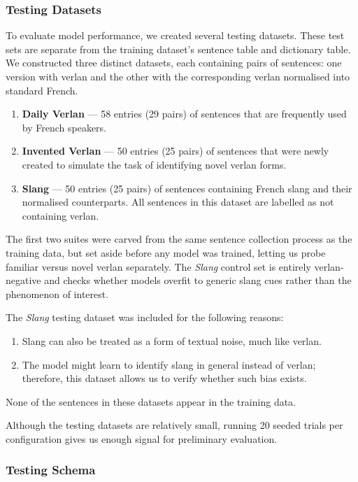 \documentclass[12pt]{article}
\begin{document}
\subsubsection{Testing Datasets}
To evaluate model performance, we created several testing datasets. 
These test sets are separate from the training dataset's sentence table and dictionary table. 
We constructed three distinct datasets, each containing pairs of sentences: one version with verlan and the other with the corresponding verlan normalised into standard French.

\begin{enumerate}
\item \textbf{Daily Verlan} --- 58 entries (29 pairs) of sentences that are frequently used by French speakers.
  \item \textbf{Invented Verlan} --- 50 entries (25 pairs) of sentences that were newly created to simulate the task of identifying novel verlan forms.
  \item \textbf{Slang} --- 50 entries (25 pairs) of sentences containing French slang and their normalised counterparts. All sentences in this dataset are labelled as not containing verlan.
\end{enumerate}

The first two suites were carved from the same sentence collection process as the training data, but set aside before any model was trained, letting us probe familiar versus novel verlan separately. The \textit{Slang} control set is entirely verlan-negative and checks whether models overfit to generic slang cues rather than the phenomenon of interest.

The \textit{Slang} testing dataset was included for the following reasons:
\begin{enumerate}
  \item Slang can also be treated as a form of textual noise, much like verlan.
  \item The model might learn to identify slang in general instead of verlan; therefore, this dataset allows us to verify whether such bias exists.
\end{enumerate}

None of the sentences in these datasets appear in the training data.
 
Although the testing datasets are relatively small, running 20 seeded trials per configuration gives us enough signal for preliminary evaluation.

\subsubsection{Testing Schema}
\end{document}
